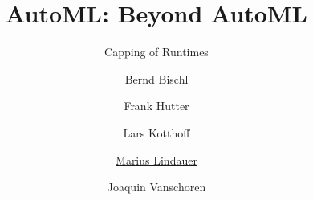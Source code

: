 


\title[AutoML: Capping]{AutoML: Beyond AutoML}
\subtitle{Capping of Runtimes}
\author[Marius Lindauer]{Bernd Bischl \and Frank Hutter \and Lars Kotthoff\newline \and \underline{Marius Lindauer} \and Joaquin Vanschoren}
\institute{}
\date{}



	
	\maketitle


